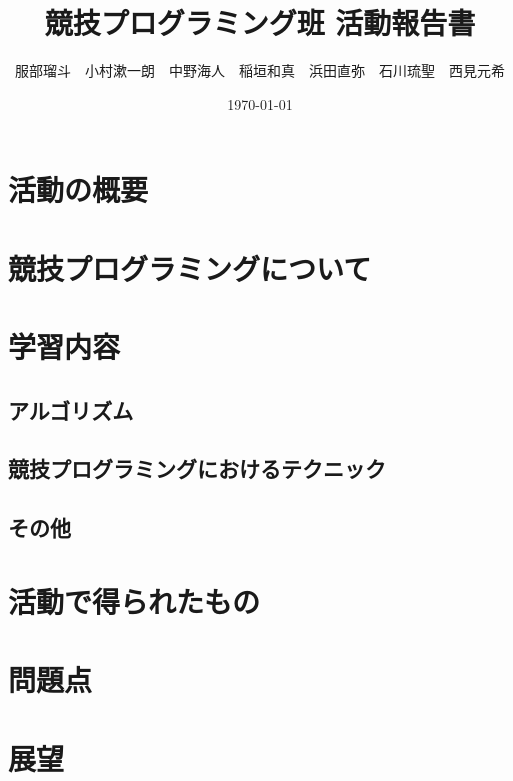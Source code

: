 \documentclass[11pt,a4paper]{jsarticle}
\title{競技プログラミング班 活動報告書}
\author{服部瑠斗　小村漱一朗　中野海人　稲垣和真　浜田直弥　石川琉聖　西見元希}
\date{\today}
\begin{document}
\maketitle
%
%
\section{活動の概要}
\section{競技プログラミングについて}
\section{学習内容}
\subsection{アルゴリズム}
\subsection{競技プログラミングにおけるテクニック}
\subsection{その他}
\section{活動で得られたもの}
\section{問題点}
\section{展望}

%
%
\end{document}
